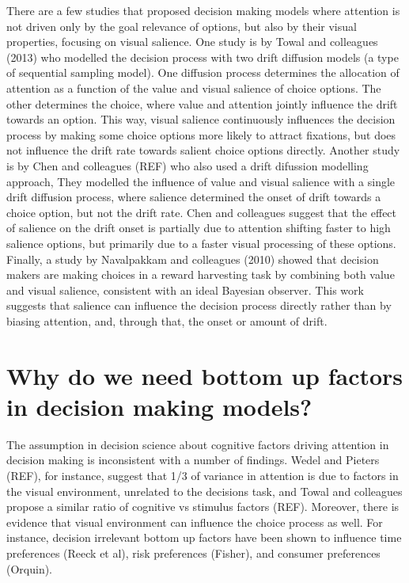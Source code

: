 \documentclass{article}
\begin{document}
There are a few studies that proposed decision making models where attention is not driven only by the goal relevance of options, but also by their visual properties, focusing on visual salience. One study is by Towal and colleagues (2013) who modelled the decision process with two drift diffusion models (a type of sequential sampling model). One diffusion process determines the allocation of attention as a function of the value and visual salience of choice options. The other determines the choice, where value and attention jointly influence the drift towards an option. This way, visual salience continuously influences the decision process by making some choice options more likely to attract fixations, but does not influence the drift rate towards salient choice options directly. Another study is by Chen and colleagues (REF) who also used a drift difussion modelling approach, They modelled the influence of value and visual salience with a single drift diffusion process, where salience determined the onset of drift towards a choice option, but not the drift rate. Chen and colleagues suggest that the effect of salience on the drift onset is partially due to attention shifting faster to high salience options, but primarily due to a faster visual processing of these options. Finally, a study by Navalpakkam and colleagues (2010) showed that decision makers are making choices in a reward harvesting task by combining both value and visual salience, consistent with an ideal Bayesian observer. This work suggests that salience can influence the decision process directly rather than by biasing attention, and, through that, the onset or amount of drift. 


\section{Why do we need bottom up factors in decision making models?}
The assumption in decision science about cognitive factors driving attention in decision making is inconsistent with a number of findings. Wedel and Pieters (REF), for instance, suggest that 1/3 of variance in attention is due to factors in the visual environment, unrelated to the decisions task, and Towal and colleagues propose a similar ratio of cognitive vs stimulus factors (REF). Moreover, there is evidence that visual environment can influence the choice process as well. For instance, decision irrelevant bottom up factors have been shown to influence time preferences (Reeck et al), risk preferences (Fisher), and consumer preferences (Orquin).
\end{document}

